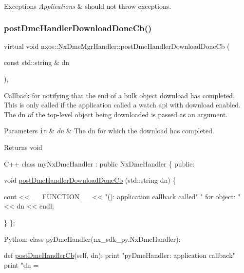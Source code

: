 \begin{DoxyExceptions}{Exceptions}
{\em Applications} & should not throw exceptions. \\
\hline
\end{DoxyExceptions}
\mbox{\label{classnxos_1_1_nx_dme_mgr_handler_a785b584b966bb8212c22e506ff568236}} 
\subsubsection{\texorpdfstring{post\+Dme\+Handler\+Download\+Done\+Cb()}{postDmeHandlerDownloadDoneCb()}}
{\footnotesize\ttfamily virtual void nxos\+::\+Nx\+Dme\+Mgr\+Handler\+::post\+Dme\+Handler\+Download\+Done\+Cb (\begin{DoxyParamCaption}\item[{const std\+::string \&}]{dn }\end{DoxyParamCaption})\hspace{0.3cm}{\ttfamily [inline]}, {\ttfamily [virtual]}}

Callback for notifying that the end of a bulk object download has completed. This is only called if the application called a watch api with download enabled. The dn of the top-\/level object being downloaded is passed as an argument. 
\begin{DoxyParams}[1]{Parameters}
\mbox{\tt in}  & {\em dn} & The dn for which the download has completed. \\
\hline
\end{DoxyParams}
\begin{DoxyReturn}{Returns}
void 
\begin{DoxyCode}
C++
  \textcolor{keyword}{class }myNxDmeHandler : \textcolor{keyword}{public} NxDmeHandler \{
  \textcolor{keyword}{public}:

    \textcolor{keywordtype}{void} \mbox{\hyperlink{classnxos_1_1_nx_dme_mgr_handler_a785b584b966bb8212c22e506ff568236}{postDmeHandlerDownloadDoneCb}} (std::string dn)
    \{

      cout << \_\_FUNCTION\_\_ << \textcolor{stringliteral}{"(): application callback called"}
         \textcolor{stringliteral}{"  for object: "} << dn  << endl;

    \}
  \};

Python:
  \textcolor{keyword}{class }pyDmeHandler(nx\_sdk\_py.NxDmeHandler):

     def \mbox{\hyperlink{classnxos_1_1_nx_dme_mgr_handler_a26838519d4f1d17c2036feb036a0e892}{postDmeHandlerCb}}(self, dn):
         print "pyDmeHandler: application callback"
         print "dn = %
\end{DoxyCode}

\end{DoxyReturn}

